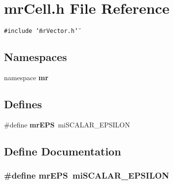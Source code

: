 \section{mr\-Cell.h File Reference}
\label{mrCell_8h}
{\tt \#include \char`\"{}mr\-Vector.h\char`\"{}}\par
\subsection*{Namespaces}
\begin{CompactItemize}
\item 
namespace {\bf mr}
\end{CompactItemize}
\subsection*{Defines}
\begin{CompactItemize}
\item 
\#define {\bf mr\-EPS}\ mi\-SCALAR\_\-EPSILON
\end{CompactItemize}


\subsection{Define Documentation}
\subsubsection{\setlength{\rightskip}{0pt plus 5cm}\#define mr\-EPS\ mi\-SCALAR\_\-EPSILON}\label{mrCell_8h_a0}


